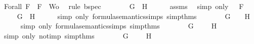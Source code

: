 \begin{isabellebody}
\ Forall{}\ {\isacartoucheopen}F\ {\isasymin}\ {\isacharbraceleft}F{\isacharbraceright}\ {\isasymunion}\ Wo{\isacartoucheclose}\ \isamarkupfalse%
\ {\isacharparenleft}rule\ bspec{\isacharparenright}\isanewline
\ \ \isamarkupfalse%
\ \isamarkupfalse%
\ {\isachardoublequoteopen}{\isasymA}\ {\isasymTurnstile}\ \isactrlbold {\isasymnot}{\isacharparenleft}G\ \isactrlbold {\isasymrightarrow}\ H{\isacharparenright}{\isachardoublequoteclose}\isanewline
\ \ \ \ \isamarkupfalse%
\ assms{\isacharparenleft}{}{\isacharparenright}\ \isamarkupfalse%
\ {\isacharparenleft}simp\ only{\isacharcolon}\ {\isacartoucheopen}{\isasymA}\ {\isasymTurnstile}\ F{\isacartoucheclose}{\isacharparenright}\isanewline
\ \ \isamarkupfalse%
\ \isamarkupfalse%
\ {\isachardoublequoteopen}{\isasymnot}{\isacharparenleft}{\isasymA}\ {\isasymTurnstile}\ {\isacharparenleft}G\ \isactrlbold {\isasymrightarrow}\ H{\isacharparenright}{\isacharparenright}{\isachardoublequoteclose}\isanewline
\ \ \ \ \isamarkupfalse%
\ {\isacharparenleft}simp\ only{\isacharcolon}\ formula{\isacharunderscore}semantics{\isachardot}simps{\isacharparenleft}{}{\isacharparenright}\ simp{\isacharunderscore}thms{\isacharparenleft}{}{\isacharparenright}{\isacharparenright}\isanewline
\ \ \isamarkupfalse%
\ \isamarkupfalse%
\ {\isachardoublequoteopen}{\isasymnot}{\isacharparenleft}{\isasymA}\ {\isasymTurnstile}\ G\ {\isasymlongrightarrow}\ {\isasymA}\ {\isasymTurnstile}\ H{\isacharparenright}{\isachardoublequoteclose}\isanewline
\ \ \ \ \isamarkupfalse%
\ {\isacharparenleft}simp\ only{\isacharcolon}\ formula{\isacharunderscore}semantics{\isachardot}simps{\isacharparenleft}{}{\isacharparenright}\ simp{\isacharunderscore}thms{\isacharparenleft}{}{\isacharparenright}{\isacharparenright}\isanewline
\ \ \isamarkupfalse%
\ \isamarkupfalse%
\ {\isachardoublequoteopen}{\isasymA}\ {\isasymTurnstile}\ G\ {\isasymand}\ {\isasymnot}\ {\isasymA}\ {\isasymTurnstile}\ H{\isachardoublequoteclose}\isanewline
\ \ \ \ \isamarkupfalse%
\ {\isacharparenleft}simp\ only{\isacharcolon}\ not{\isacharunderscore}imp\ simp{\isacharunderscore}thms{\isacharparenleft}{}{\isacharparenright}{\isacharparenright}\isanewline
\ \ \isamarkupfalse%
\ \isamarkupfalse%
\ {\isachardoublequoteopen}{\isasymA}\ {\isasymTurnstile}\ G\ {\isasymand}\ {\isasymA}\ {\isasymTurnstile}\ \isactrlbold {\isasymnot}\ H{\isachardoublequoteclose}\isanewline

\end{isabellebody}
